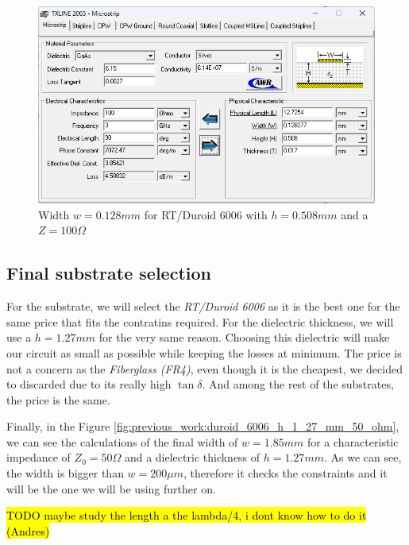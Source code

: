 \documentclass[12pt]{report} %
\newcommand{\todo}[1]{\sethlcolor{green}\hl{TODO #1}}
\begin{document}
\begin{figure}[htbp]
    \centering
    \includegraphics[width=\textwidth]{images/previous_work/txline_tool_duroid_6006_h_0_508_mm_100_ohm.png}
    \caption{Width $w = 0.128 mm$ for RT/Duroid 6006 with $h = 0.508 mm$ and a $Z = 100 \Omega$}
    \label{fig:previous_work:duroid_6006_h_0_508_mm_100_ohm}
\end{figure}

\subsection{Final substrate selection}

For the substrate, we will select the \textit{RT/Duroid 6006} as it is the best one for the same price that fits the contratins required. For the dielectric thickness, we will use a $h = 1.27 mm$ for the very same reason. Choosing this dielectric will make our circuit as small as possible while keeping the losses at minimum. The price is not a concern as the \textit{Fiberglass (FR4)}, even though it is the cheapest, we decided to discarded due to its really high $\tan \delta$. And among the rest of the substrates, the price is the same.

Finally, in the Figure \ref{fig:previous_work:duroid_6006_h_1_27_mm_50_ohm}, we can see the calculations of the final width of $w = 1.85 mm$ for a characteristic impedance of $Z_{0} = 50 \Omega$ and a dielectric thickness of $h = 1.27 mm$. As we can see, the width is bigger than $w = 200 \mu m$, therefore it checks the constraints and it will be the one we will be using further on.

\todo{maybe study the length a the lambda/4, i dont know how to do it (Andres)}
\end{document}
